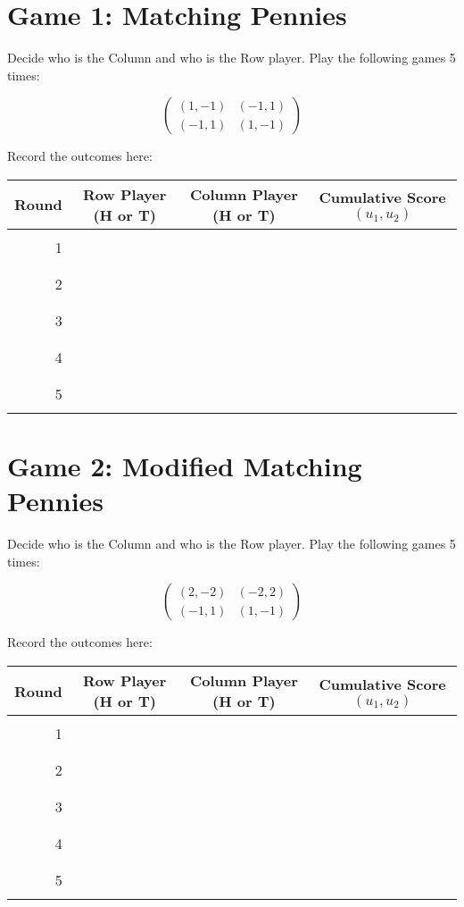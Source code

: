 \documentclass{article}
\begin{document}
\section{Game 1: Matching Pennies}

Decide who is the Column and who is the Row player. Play the following games 5 times:

$$\begin{pmatrix}
(1,-1) & (-1, 1)\\
(-1,1) & (1,-1)
\end{pmatrix}$$

Record the outcomes here:

\begin{center}
\begin{tabular}{r|c|c|c}
\toprule
Round & Row Player (H or T) & Column Player (H or T) & Cumulative Score $(u_1,u_2)$\\
\midrule
&&&\\
1&&&\\
&&&\\
&&&\\
2&&&\\
&&&\\
&&&\\
3&&&\\
&&&\\
&&&\\
4&&&\\
&&&\\
&&&\\
5&&&\\
&&&\\
\bottomrule
\end{tabular}
\end{center}

\newpage
\section{Game 2: Modified Matching Pennies}

Decide who is the Column and who is the Row player. Play the following games 5 times:

$$\begin{pmatrix}
(2,-2) & (-2, 2)\\
(-1,1) & (1,-1)
\end{pmatrix}$$

Record the outcomes here:

\begin{center}
\begin{tabular}{r|c|c|c}
\toprule
Round & Row Player (H or T) & Column Player (H or T) & Cumulative Score $(u_1,u_2)$\\
\midrule
&&&\\
1&&&\\
&&&\\
&&&\\
2&&&\\
&&&\\
&&&\\
3&&&\\
&&&\\
&&&\\
4&&&\\
&&&\\
&&&\\
5&&&\\
&&&\\
\bottomrule
\end{tabular}
\end{center}
\end{document}
